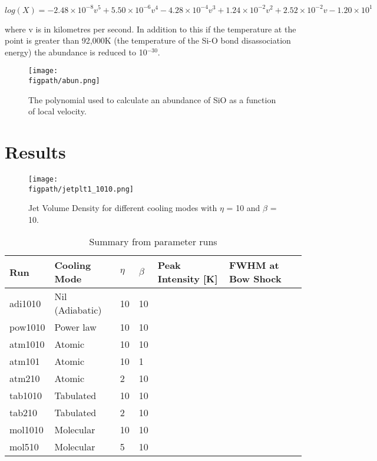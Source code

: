 \documentclass[useAMS,usenatbib,letters]{mn2e}
\newcommand{\figpath}{PFIGS/}
\begin{document}
$log(X)=-2.48\times10^{-8}v^5 + 5.50\times10^{-6}v^4 - 4.28\times10^{-4}v^3 + 1.24\times10^{-2}v^2 + 2.52\times10^{-2}v - 1.20\times10^{1}$\smallskip

where v is in kilometres per second. In addition to this if the temperature at the point is greater than 92,000K (the temperature of the Si-O bond disassociation energy) the abundance is reduced to 10$^{-30}$.

\begin{figure}
 \texttt{[image: \\figpath/abun.png]}
 \caption{The polynomial used to calculate an abundance of SiO as a function of local velocity.}
 \label{abun}
\end{figure}


\section{Results}
\begin{figure*}
 \texttt{[image: \\figpath/jetplt1\_1010.png]}
 \caption{Jet Volume Density for different cooling modes with
   $\eta$ = 10 and $\beta$ = 10.}
\label{grid}
\end{figure*}
\begin{table*}
\centering
\caption{Summary from parameter runs}
\begin{tabular}{l | l | l | l | l | l }
\hline
Run & Cooling Mode & $\eta$ & $\beta$ & Peak Intensity [K] & FWHM at Bow
Shock \\
\hline\hline
adi1010 & Nil (Adiabatic) & 10 & 10 &&\\
pow1010 & Power law & 10 & 10 &&\\
atm1010 & Atomic & 10 & 10 &&\\
atm101 & Atomic & 10 & 1 &&\\
atm210 & Atomic & 2 & 10 &&\\
tab1010 & Tabulated & 10 & 10 &&\\
tab210 & Tabulated & 2 & 10&&\\
mol1010 & Molecular & 10 & 10&&\\
mol510 & Molecular & 5 & 10&&\\
\hline
\end{tabular}
\label{tab:result1}
\end{table*}
\end{document}
